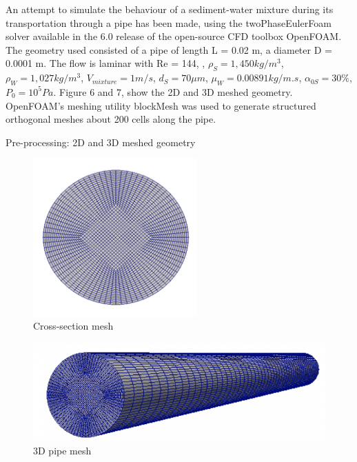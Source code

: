 \documentclass[11pt]{report}
\begin{document}
An attempt to simulate the behaviour of a sediment-water mixture during its transportation through a pipe has been made, using the twoPhaseEulerFoam solver available in the 6.0 release of the open-source CFD toolbox OpenFOAM. 
%
The geometry used consisted of a pipe of length L = 0.02 m, a diameter D = 0.0001 m. 
%
The flow is laminar with Re = 144,  , $\rho_S= 1,450  kg/m^3$, $\rho_W= 1,027  kg/m^3$, $V_{mixture} = 1 m/s$, $d_S= 70 \mu m$, $\mu_W = 0.00891  kg/m.s$, $\alpha_{0S} = 30 \%$, $P_0=10^5  Pa$. 
%
Figure 6 and 7, show the 2D and 3D meshed geometry. OpenFOAM's meshing utility blockMesh was used to generate structured orthogonal meshes about 200 cells along the pipe.
%
\begin{itemize}
 \bf{\item Pre-processing: 2D and 3D meshed geometry}
  \end{itemize}
 \vspace{0.5cm}
\vspace{-0.6cm}
\begin{figure}[ht!]
 \begin{center}
 
 \includegraphics[trim=0cm 0cm 0cm 0cm,clip,scale=0.6]{figs/1.png}
 \caption{ Cross-section mesh}
 \label{fig:gauss}
 \end{center}
 \end{figure} 
%
 \begin{figure}[ht!]
 \begin{center}
 
 \includegraphics[trim=0cm 0cm 0cm 0cm,clip,scale=0.6]{figs/2.png}
 \caption{ 3D pipe mesh}
 \label{fig:gauss}
 \end{center}
 \end{figure} 
\end{document}
